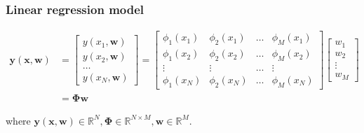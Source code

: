 \begin{frame}
    \frametitle{Linear regression model}

    \scriptsize
    \begin{align*}
        \mathbf{y}(\mathbf{x},\mathbf{w})&=
            \left[\begin{array}{c}
                      y(x_1,\mathbf{w})\\
                      y(x_2,\mathbf{w})\\
                      \ldots\\
                      y(x_N,\mathbf{w})
                  \end{array}\right]=
            \left[\begin{array}{cccc}
                      \phi_1(x_1)&\phi_2(x_1)&\ldots&\phi_M(x_1)\\
                      \phi_1(x_2)&\phi_2(x_2)&\ldots&\phi_M(x_2)\\
                      \vdots     &\vdots     &\ldots&\vdots\\
                      \phi_1(x_N)&\phi_2(x_N)&\ldots&\phi_M(x_N)
            \end{array}\right]\left[\begin{array}{c}
                                        w_1\\
                                        w_2\\
                                        \vdots\\
                                        w_M
                                    \end{array}\right]\\
                                         &=\boldsymbol{\Phi}\mathbf{w}
    \end{align*}

    where
    $\mathbf{y}(\mathbf{x},\mathbf{w})\in\mathbb{R}^N,\boldsymbol{\Phi}\in\mathbb{R}^{N\times M},\mathbf{w}\in\mathbb{R}^M$.
    \normalsize
\end{frame}

